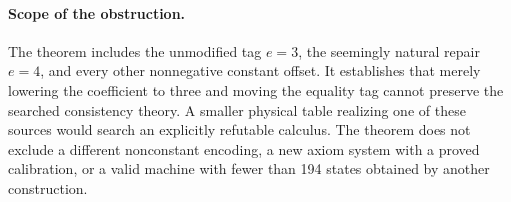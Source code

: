\paragraph{Scope of the obstruction.}
The theorem includes the unmodified tag $e=3$, the seemingly natural repair
$e=4$, and every other nonnegative constant offset. It establishes that
merely lowering the coefficient to three and moving the equality tag
cannot preserve the searched consistency theory. A smaller physical table
realizing one of these sources would search an explicitly refutable
calculus. The theorem does not exclude a different nonconstant encoding,
a new axiom system with a proved calibration, or a valid machine with
fewer than 194 states obtained by another construction.
